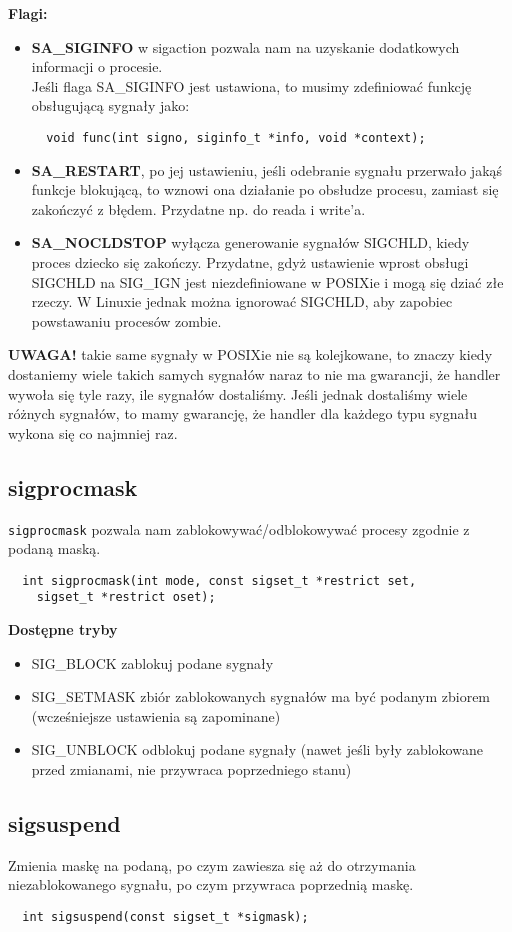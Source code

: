 \textbf{Flagi:}
\begin{itemize}
	\item \textbf{SA\_SIGINFO} w sigaction pozwala nam na uzyskanie dodatkowych informacji o procesie.\\
	      Jeśli flaga SA\_SIGINFO jest ustawiona, to musimy zdefiniować funkcję obsługującą sygnały jako:
	      \begin{verbatim}
  void func(int signo, siginfo_t *info, void *context);
  \end{verbatim}
	\item \textbf{SA\_RESTART}, po jej ustawieniu, jeśli odebranie sygnału przerwało jakąś funkcje blokującą, to wznowi ona działanie po obsłudze procesu, zamiast się zakończyć z błędem. Przydatne np. do reada i write'a.
	\item \textbf{SA\_NOCLDSTOP} wyłącza generowanie sygnałów SIGCHLD, kiedy proces dziecko się zakończy. Przydatne, gdyż ustawienie wprost obsługi SIGCHLD na SIG\_IGN jest niezdefiniowane w POSIXie i mogą się dziać złe rzeczy. W Linuxie jednak można ignorować SIGCHLD, aby zapobiec powstawaniu procesów zombie.
\end{itemize}
\textbf{UWAGA!} takie same sygnały w POSIXie nie są kolejkowane, to znaczy kiedy dostaniemy wiele takich samych sygnałów naraz to nie ma gwarancji, że handler wywoła się tyle razy, ile sygnałów dostaliśmy. Jeśli jednak dostaliśmy wiele różnych sygnałów, to mamy gwarancję, że handler dla każdego typu sygnału wykona się co najmniej raz.
\subsection{sigprocmask}
\texttt{sigprocmask} pozwala nam zablokowywać/odblokowywać procesy zgodnie z podaną maską.
\begin{verbatim}
  int sigprocmask(int mode, const sigset_t *restrict set,
    sigset_t *restrict oset);
\end{verbatim}
\textbf{Dostępne tryby}
\begin{itemize}
	\item SIG\_BLOCK zablokuj podane sygnały
	\item SIG\_SETMASK zbiór zablokowanych sygnałów ma być podanym zbiorem (wcześniejsze ustawienia są zapominane)
	\item SIG\_UNBLOCK odblokuj podane sygnały (nawet jeśli były zablokowane przed zmianami, nie przywraca poprzedniego stanu)
\end{itemize}
\subsection{sigsuspend}
Zmienia maskę na podaną, po czym zawiesza się aż do otrzymania niezablokowanego sygnału, po czym przywraca poprzednią maskę.
\begin{verbatim}
  int sigsuspend(const sigset_t *sigmask);
\end{verbatim}
